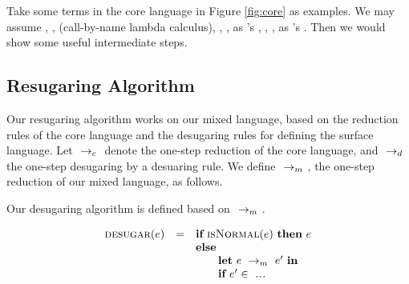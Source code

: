 Take some terms in the core language in Figure \ref{fig:core} as examples.
We may assume , ,  (call-by-name lambda calculus), , ,  as 's , , \m{$\lambda$},  as 's . Then we would show some useful intermediate steps.


\subsection{Resugaring Algorithm}

Our resugaring algorithm works on our mixed language, based on the reduction rules of the core language and the desugaring rules for defining the surface language. Let $~\rightarrow_c~$ denote the one-step reduction of the core language, and $~\rightarrow_d~$ the one-step desugaring by a desuaring rule. We define $~\rightarrow_m~$, the one-step reduction of our mixed language, as follows.

{}

{}

{
}

Our desugaring algorithm is defined based on $~\rightarrow_m~$.

\[
\begin{array}{llll}
\mbox{\sc desugar} (e) &=& \mbox{\rm \bf if}~\mbox{\sc isNormal}(e)~\mbox{\rm \bf then}~e\\
              & & \mbox{\rm \bf else}~\\
							& & \qquad \mbox{\rm \bf let}~e ~\rightarrow_m~e'~\mbox{\rm \bf in}\\
							& & \qquad \mbox{\rm \bf if}~e' \in~\mbox{\sc ...}
\end{array}
\]

